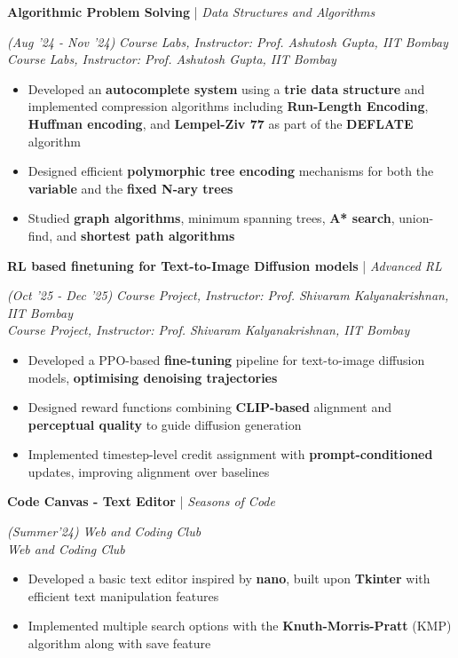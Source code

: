 \documentclass[10pt]{article}
\renewcommand{\subsection}[4]{
	\def\temp{#4}
	\vspace{2pt}
	{
		\large
		{\color{Green} \textbf{#1}} | {\sl #2} \filldate{#3}
		\ifx\temp\empty
		\else
		{
			\\[0.098em]
			\fontsize{10.5}{13.2}\selectfont
			\sl #4
		}
		\fi
	}
}
\newcommand{\filldate}[1]{\strut\hfill {\small \textit{(#1)}}}
\begin{document}
\vspace{-13px}

\subsection{Algorithmic Problem Solving}{Data Structures and Algorithms}{Aug '24 - Nov '24}{\textit{Course Labs, Instructor: Prof. Ashutosh Gupta, IIT Bombay}}  
\begin{itemize}
    \item Developed an \textbf{autocomplete system} using a \textbf{trie data structure} and implemented compression algorithms including \textbf{Run-Length Encoding}, \textbf{Huffman encoding}, and \textbf{Lempel-Ziv 77} as part of the \textbf{DEFLATE} algorithm  
    \item Designed efficient \textbf{polymorphic tree encoding} mechanisms for both the \textbf{variable} and the \textbf{fixed N-ary trees}  
    \item Studied \textbf{graph algorithms}, minimum spanning trees, \textbf{A* search}, union-find, and \textbf{shortest path algorithms}
\end{itemize}

\subsection{RL based finetuning for Text-to-Image Diffusion models}{Advanced RL}{Oct '25 - Dec '25}{\textit{Course Project, Instructor: Prof. Shivaram Kalyanakrishnan, IIT Bombay}}
\begin{itemize}
\item Developed a PPO-based \textbf{fine-tuning} pipeline for text-to-image diffusion models, \textbf{optimising denoising trajectories}
\item Designed reward functions combining \textbf{CLIP-based} alignment and \textbf{perceptual quality} to guide diffusion generation
\item Implemented timestep-level credit assignment with \textbf{prompt-conditioned} updates, improving alignment over baselines
\end{itemize}

\newpage
{}

\subsection{Code Canvas - Text Editor}{Seasons of Code}{Summer'24}{\textit{Web and Coding Club}}  
\begin{itemize}
    \item Developed a basic text editor inspired by \textbf{nano}, built upon \textbf{Tkinter} with efficient text manipulation features
    \item Implemented multiple search options with the \textbf{Knuth-Morris-Pratt} (KMP) algorithm along with save feature
\end{itemize}
\end{document}

